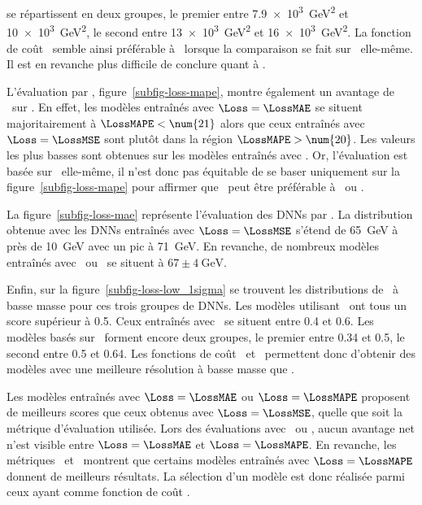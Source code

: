 se répartissent en deux groupes,
le premier
entre \SI{7.9e3}{\GeV^2} et \SI{10e3}{\GeV^2},
le second
entre \SI{13e3}{\GeV^2} et \SI{16e3}{\GeV^2}.
La fonction de coût \LossMAE\ semble ainsi préférable à \LossMSE\ lorsque la comparaison se fait sur \LossMSE\ elle-même.
Il est en revanche plus difficile de conclure quant à \LossMAPE.
\par
L'évaluation par \LossMAPE, figure~\ref{subfig-loss-mape},
montre également un avantage de \LossMAE\ sur \LossMSE.
En effet, les modèles
entraînés avec $\Loss=\LossMAE$
se situent majoritairement à $\LossMAPE<\num{21}$
alors que ceux
entraînés avec $\Loss=\LossMSE$
sont plutôt dans la région $\LossMAPE>\num{20}$.
Les valeurs les plus basses sont obtenues sur les modèles entraînés avec \LossMAPE.
Or, l'évaluation est basée sur \LossMAPE\ elle-même,
il n'est donc pas équitable de se baser uniquement sur la figure~\ref{subfig-loss-mape}
pour affirmer que \LossMAPE\ peut être préférable à \LossMAE\ ou \LossMSE.
\par
La figure~\ref{subfig-loss-mae} représente l'évaluation des DNNs par \LossMAE.
La distribution obtenue avec les DNNs entraînés avec $\Loss=\LossMSE$
s'étend de \SI{65}{\GeV} à près de \SI{10}{\GeV} avec un pic à \SI{71}{\GeV}.
En revanche, de nombreux modèles entraînés avec \LossMAE\ ou \LossMAPE\
se situent à $\num{67}\pm\SI{4}{\GeV}$.
\par
Enfin,
sur la figure~\ref{subfig-loss-low_1sigma} se trouvent les distributions
de \OneSigmaWidth\ à basse masse pour ces trois groupes de DNNs.
Les modèles utilisant \LossMSE\ ont tous un score supérieur à \num{0.5}.
Ceux entraînés avec \LossMAE\ se situent entre \num{0.4} et \num{0.6}.
Les modèles basés sur \LossMAPE\ forment encore deux groupes,
le premier entre \num{0.34} et \num{0.5},
le second entre \num{0.5} et \num{0.64}.
Les fonctions de coût \LossMAPE\ et \LossMAE\ permettent donc d'obtenir des modèles avec une meilleure résolution à basse masse que \LossMSE.
\par
Les modèles entraînés avec $\Loss=\LossMAE$ ou $\Loss=\LossMAPE$
proposent de meilleurs scores que ceux obtenus avec $\Loss=\LossMSE$,
quelle que soit la métrique d'évaluation utilisée.
Lors des évaluations avec \LossMSE\ ou \LossMAE,
aucun avantage net n'est visible entre $\Loss=\LossMAE$ et $\Loss=\LossMAPE$.
En revanche, les métriques \LossMAPE\ et \OneSigmaWidth\ montrent que certains modèles
entraînés avec $\Loss=\LossMAPE$
donnent de meilleurs résultats.
La sélection d'un modèle est donc réalisée parmi ceux ayant comme fonction de coût \LossMAPE.
